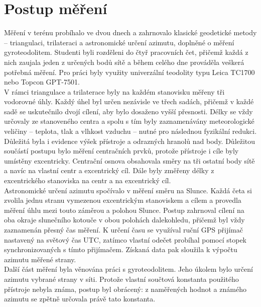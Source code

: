 \section{Postup měření}
\tab Měření v terénu probíhalo ve dvou dnech a zahrnovalo klasické geodetické metody – triangulaci, trilateraci a astronomické určení azimutu, doplněné o měření gyroteodolitem. Studenti byli rozděleni do čtyř pracovních čet, přičemž každá z nich zaujala jeden z určených bodů sítě a během celého dne prováděla veškerá potřebná měření. Pro práci byly využity univerzální teodolity typu Leica TC1700 nebo Topcon GPT-7501.\\
\tab %
V rámci triangulace a trilaterace byly na každém stanovisku měřeny tři vodorovné úhly. Každý úhel byl určen nezávisle ve třech sadách, přičemž v každé sadě se uskutečnilo dvojí cílení, aby bylo dosaženo vyšší přesnosti. Délky se vždy určovaly ze stanoveného centra a spolu s tím byly zaznamenávány meteorologické veličiny – teplota, tlak a vlhkost vzduchu – nutné pro následnou fyzikální redukci. Důležitá byla i evidence výšek přístroje a odrazných hranolů nad body. Důležitou součástí postupu bylo měření centračních prvků, protože přístroje i cíle byly umístěny excentricky. Centrační osnova obsahovala směry na tři ostatní body sítě a navíc na vlastní centr a excentrický cíl. Dále byly změřeny délky z excentrického stanoviska na centr a na excentrický cíl. \\
\tab Astronomické určení azimutu spočívalo v měření směru na Slunce. Každá četa si zvolila jednu stranu vymezenou excentrickým stanoviskem a cílem a provedla měření úhlu mezi touto záměrou a polohou Slunce. Postup zahrnoval cílení na oba okraje slunečního kotouče v obou polohách dalekohledu, přičemž byl vždy zaznamenán přesný čas měření. K určení času se využíval ruční GPS přijímač nastavený na světový čas UTC, zatímco vlastní odečet probíhal pomocí stopek synchronizovaných s tímto přijímačem. Získaná data pak sloužila k výpočtu azimutu měřené strany.\\
\tab Další část měření byla věnována práci s gyroteodolitem. Jeho úkolem bylo určení azimutu vybrané strany v síti. Protože vlastní součtová konstanta použitého přístroje nebyla známa, postup byl obrácený: z naměřených hodnot a známého azimutu se zpětně určovala právě tato konstanta.

